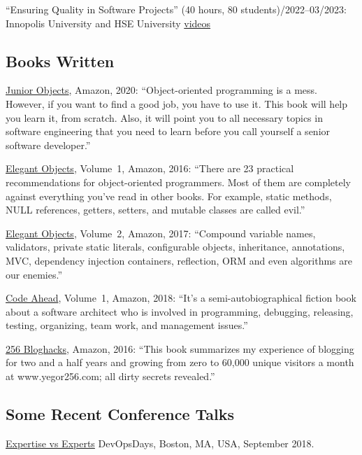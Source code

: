 \documentclass{yb}
\begin{document}
``Ensuring Quality in Software Projects'' (40 hours, 80 students)/2022--03/2023: Innopolis University and HSE University\newline
\href{https://www.youtube.com/playlist?list=PLaIsQH4uc08y14wCJMeffS2yErN4QpB8m}{videos}

\subsection*{Books Written}

\href{https://amzn.to/2u9BbqF}{Junior Objects}, Amazon, 2020:
``Object-oriented programming is a mess. However,
if you want to find a good job, you have to use it.
This book will help you learn it, from scratch.
Also, it will point you to all necessary topics
in software engineering that you need to learn before
you call yourself a senior software developer.''

\href{https://amzn.to/2E5UHqZ}{Elegant Objects}, Volume~1, Amazon, 2016:
``There are 23 practical recommendations for object-oriented programmers. Most of them are completely
against everything you've read in other books.
For example, static methods, NULL references, getters, setters, and
mutable classes are called evil.''

\href{https://amzn.to/2J2s5T4}{Elegant Objects}, Volume~2, Amazon, 2017:
``Compound variable names, validators, private static literals, configurable objects, inheritance,
annotations, MVC, dependency injection containers, reflection, ORM and even algorithms are our enemies.''

\href{https://amzn.to/2u9BbqF}{Code Ahead}, Volume~1, Amazon, 2018:
``It's a semi-autobiographical fiction book about a software architect
who is involved in programming, debugging, releasing, testing,
organizing, team work, and management issues.''

\href{https://amzn.to/2GkuyXf}{256 Bloghacks}, Amazon, 2016:
``This book summarizes my experience of blogging for two and a half years and growing from zero to 60,000
unique visitors a month at www.yegor256.com; all dirty secrets revealed.''

\subsection*{Some Recent Conference Talks}

\begin{samepage}
\href{https://youtu.be/KCx1o_lSMkI}{Expertise vs Experts}\newline
DevOpsDays, Boston, MA, USA, September 2018.
\end{samepage}
\end{document}

